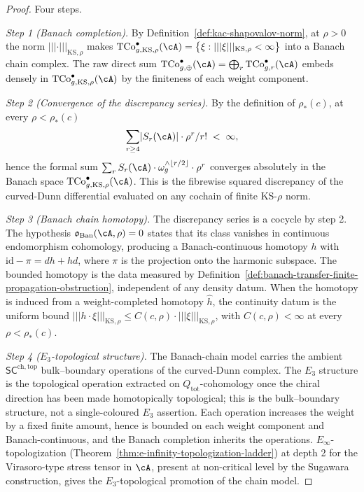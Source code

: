 \begin{proof}
Four steps.

\emph{Step 1 (Banach completion).}
By Definition~\ref{def:kac-shapovalov-norm}, at $\rho > 0$ the norm
$\lvert\lvert\lvert \cdot \rvert\rvert\rvert_{\mathrm{KS}, \rho}$
makes
$\mathrm{TCo}^{\bullet}_{g, \mathrm{KS}, \rho}(\cA) =
\bigl\{ \xi : \lvert\lvert\lvert \xi \rvert\rvert\rvert_{\mathrm{KS}, \rho}
< \infty \bigr\}$
into a Banach chain complex. The raw direct sum
$\mathrm{TCo}^{\bullet}_{g, \oplus}(\cA) = \bigoplus_r
\mathrm{TCo}^{\bullet}_{g, r}(\cA)$ embeds densely in
$\mathrm{TCo}^{\bullet}_{g, \mathrm{KS}, \rho}(\cA)$ by the
finiteness of each weight component.

\emph{Step 2 (Convergence of the discrepancy series).}
By the definition of $\rho_*(c)$, at every $\rho < \rho_*(c)$
\[
 \sum_{r \ge 4}
 \lvert S_r(\cA) \rvert \cdot \rho^r / r!
 \;<\; \infty,
\]
hence the formal sum $\sum_r S_r(\cA) \cdot \omega_g^{\wedge \lfloor r/2 \rfloor}
\cdot \rho^r$ converges absolutely in the Banach space
$\mathrm{TCo}^{\bullet}_{g, \mathrm{KS}, \rho}(\cA)$. This is the
fibrewise squared discrepancy of the curved-Dunn differential
evaluated on any cochain of finite KS-$\rho$ norm.

\emph{Step 3 (Banach chain homotopy).}
The discrepancy series is a cocycle by step 2. The hypothesis
$\mathfrak{o}_{\mathrm{Ban}}(\cA,\rho)=0$ states that its class
vanishes in continuous endomorphism cohomology, producing a
Banach-continuous homotopy $h$ with
$\mathrm{id} - \pi = d h + h d$, where $\pi$ is the projection onto
the harmonic subspace. The bounded homotopy is the data measured by
Definition~\ref{def:banach-transfer-finite-propagation-obstruction},
independent of any density datum. When the homotopy is induced from a
weight-completed homotopy $\hat h$, the continuity datum is the
uniform bound
$\lvert\lvert\lvert h \cdot \xi \rvert\rvert\rvert_{\mathrm{KS}, \rho}
\le C(c, \rho) \cdot \lvert\lvert\lvert \xi \rvert\rvert\rvert_{\mathrm{KS}, \rho}$,
with $C(c, \rho) < \infty$ at every $\rho < \rho_*(c)$.

\emph{Step 4 ($E_3$-topological structure).}
The Banach-chain model carries the ambient
$\mathsf{SC}^{\mathrm{ch,top}}$ bulk--boundary operations of the
curved-Dunn complex. The $E_3$ structure is the topological operation
extracted on $Q_{\mathrm{tot}}$-cohomology once the chiral direction
has been made homotopically topological; this is the bulk--boundary
structure, not a single-coloured $E_3$ assertion. Each operation
increases the weight by a fixed finite amount, hence is bounded on
each weight component and Banach-continuous, and the Banach completion
inherits the operations.
$E_\infty$-topologization
(Theorem~\ref{thm:e-infinity-topologization-ladder}) at depth 2 for
the Virasoro-type stress tensor in $\cA$, present at non-critical
level by the Sugawara construction, gives the $E_3$-topological
promotion of the chain model.


\end{proof}

